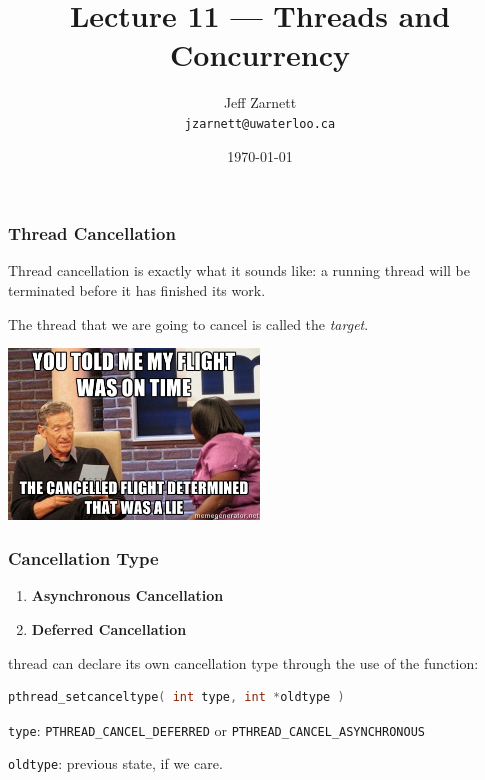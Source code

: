 

\title{Lecture 11 --- Threads and Concurrency }

\author{Jeff Zarnett \\ \small \texttt{jzarnett@uwaterloo.ca}}
\date{\today}




\begin{frame}
	\titlepage
\end{frame}


\begin{frame}
	\frametitle{Thread Cancellation}

	Thread cancellation is exactly what it sounds like: a running thread will be terminated before it has finished its work.

	The thread that we are going to cancel is called the \textit{target}.

	\begin{center}
		\includegraphics[width=0.5\textwidth]{images/canceled_flight.jpg}
	\end{center}

\end{frame}


\begin{frame}[fragile]
	\frametitle{Cancellation Type}

	\begin{enumerate}
		\item \textbf{Asynchronous Cancellation}
		\item \textbf{Deferred Cancellation}
	\end{enumerate}

	thread can declare its own cancellation type through the use of the function:
	\begin{lstlisting}[language=C]
pthread_setcanceltype( int type, int *oldtype )
\end{lstlisting}

	\texttt{type}: \texttt{PTHREAD\_CANCEL\_DEFERRED} or \texttt{PTHREAD\_CANCEL\_ASYNCHRONOUS}

	\texttt{oldtype}: previous state, if we care.

\end{frame}

